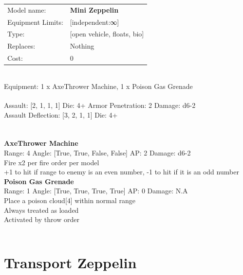 \noindent
\begin{tabular}{ll}
Model name: &{\bf Mini Zeppelin } \\
Equipment Limits: &[independent:∞] \\
Type: &[open vehicle, floats, bio] \\
Replaces: &Nothing \\
Cost: & 0\\
\end{tabular}
\ \\
Equipment: 1 x AxeThrower Machine, 1 x Poison Gas Grenade \\
\ \\
Assault: [2, 1, 1, 1] Die: 4+ Armor Penetration: 2 Damage: d6-2 \\
Assault Deflection: [3, 2, 1, 1] Die: 4+\\
\indent  
\ \\

\ \\
{\bf AxeThrower Machine } \\



Range: 4  Angle: [True, True, False, False] AP: 2 Damage: d6-2 \\
Fire x2 per fire order per model\\ 
+1 to hit if range to enemy is an even number, -1 to hit if it is an odd number\\ 




{\bf Poison Gas Grenade } \\



Range: 1  Angle: [True, True, True, True] AP: 0 Damage: N.A \\
Place a poison cloud[4] within normal range\\ 
Always treated as loaded\\ 
Activated by throw order\\ 




 
\ \\













\clearpage

\section{ Transport Zeppelin }

